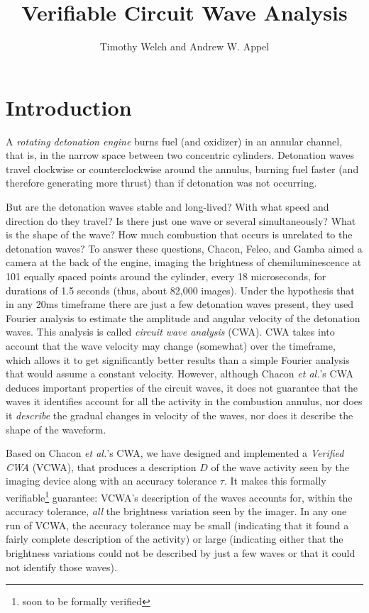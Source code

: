 \documentclass{article}
\begin{document}
\title{Verifiable Circuit Wave Analysis}
\author{Timothy Welch and Andrew W. Appel}


\maketitle

\section{Introduction}

A \emph{rotating detonation engine} burns fuel (and oxidizer) in an
annular channel, that is, in the narrow space between two concentric
cylinders.  Detonation waves travel clockwise or counterclockwise
around the annulus, burning fuel faster (and therefore generating more
thrust) than if detonation was not occurring.

But are the detonation waves stable and long-lived?  With what speed
and direction do they travel?  Is there just one wave or several
simultaneously?  What is the shape of the wave?  How much combustion
that occurs is unrelated to the detonation waves?  To answer these
questions, Chacon, Feleo, and Gamba \cite{chacon21} aimed a camera at
the back of the engine, imaging the brightness of chemiluminescence at
101 equally spaced points around the cylinder, every 18 microseconds,
for durations of 1.5 seconds (thus, about 82,000 images).  Under the
hypothesis that in any 20ms timeframe there are just a few detonation
waves present, they used Fourier analysis to estimate the amplitude
and angular velocity of the detonation waves.  This analysis is called
\emph{circuit wave analysis} (CWA).  CWA takes into account that
the wave velocity may change (somewhat) over the timeframe, which allows
it to get significantly better results than a simple Fourier analysis
that would assume a constant velocity.
However, although Chacon \emph{et al.}'s CWA
deduces important properties of the circuit waves, it does not
guarantee that the waves it identifies account for all the activity in
the combustion annulus, nor does it \emph{describe} the gradual changes in velocity
of the waves, nor does it describe the shape of the waveform.

Based on Chacon \emph{et al.}'s CWA, we have designed and implemented
a \emph{Verified CWA} (VCWA), that produces a description $D$ of the
wave activity seen by the imaging device along with an accuracy
tolerance $\tau$.  It makes this formally verifiable\footnote{soon to
be formally verified} guarantee: VCWA's description of the waves
accounts for, within the accuracy tolerance, \emph{all} the
brightness variation seen by the imager.  In any one run of VCWA, the
accuracy tolerance may be small (indicating that it found a fairly
complete description of the activity) or large (indicating either that
the brightness variations could not be described by just a few waves
or that it could not identify those waves).
\end{document}
